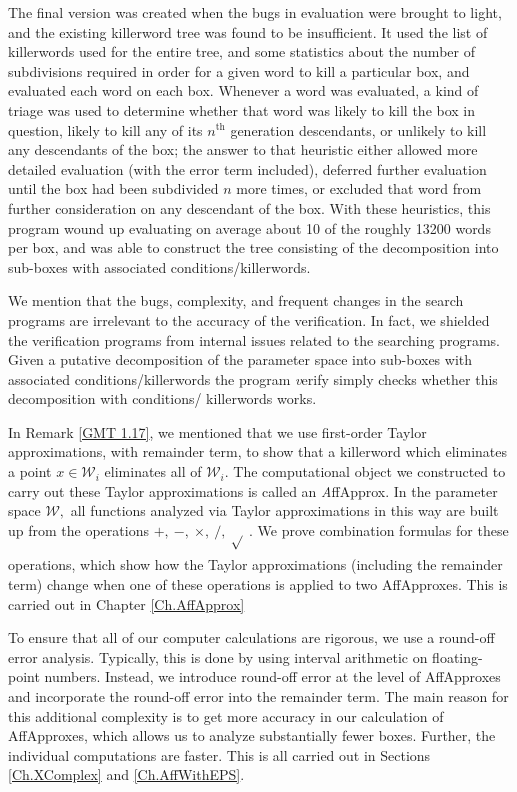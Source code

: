 \begin{remark}
The final version was created when the bugs in evaluation were 
brought to light, and the existing killerword tree was found to be insufficient.  
It used the list of killerwords used for the entire tree, and some 
statistics about the number of subdivisions required in order for a 
given word to kill a particular box, and evaluated each word on each box.  Whenever 
a word was evaluated, a kind of triage was used to determine 
whether that word was likely to kill the box in question, likely to kill 
any of its $n^\mathrm {th}$ generation descendants, or unlikely to kill any 
descendants of the box; the answer to that heuristic either allowed more 
detailed evaluation (with the error term included), deferred further 
evaluation until the box had been subdivided $n$ more times, or 
excluded that word from further consideration on any descendant of 
the box.  With these heuristics, this program wound up evaluating on 
average about 10 of the roughly 13200 words per box, and was able to 
construct the tree consisting of the decomposition into sub-boxes with associated conditions/killerwords.

We mention that the bugs, complexity, and 
frequent changes in the search programs are irrelevant to the 
accuracy of the verification.  In fact, we shielded the verification 
programs from internal issues related to the searching programs.  
Given a putative decomposition of the parameter space into 
sub-boxes with associated conditions/killerwords the program {\textit verify} 
simply checks whether this decomposition with conditions/ 
killerwords works. 
\end{remark}

\begin{preview}\label{GMT 1.35}
	In Remark \ref{GMT 1.17}, we mentioned that we use first-order Taylor approximations, with remainder term, to show that
a killerword which eliminates a point $x\in \mathcal {W}_i$ eliminates all of $\mathcal {W}_i.$  
The computational object we constructed to carry out these Taylor approximations is called an {\textit AffApprox}.
In the parameter space $\mathcal {W},$ all functions analyzed via Taylor
approximations in this way are built up from the
operations $ +,\ -,\ \times, \  /,\ \sqrt{}_{\phantom{|}} .$  We prove combination
formulas for these operations, which show how the Taylor approximations
(including the remainder term) change when one of these operations is
applied to two AffApproxes.   This is carried out in
	Chapter \ref{Ch.AffApprox}

To ensure that all of our computer calculations are rigorous, we use a round-off error analysis.  Typically, this is done by using interval
arithmetic on floating-point numbers. 
Instead, we introduce
round-off error at the level of AffApproxes and
incorporate the round-off error into the remainder term.  
The main reason for this additional complexity is to get
more accuracy in our calculation of AffApproxes, 
which allows us to analyze substantially fewer boxes.
Further, the individual computations are faster.
This is all
carried out in
	Sections \ref{Ch.XComplex} and \ref{Ch.AffWithEPS}.
\end{preview}
